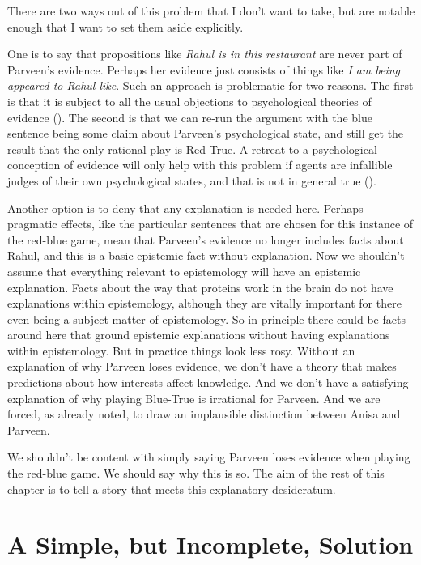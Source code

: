 \documentclass[
  12pt,
  letterpaper,
]{scrbook}
\begin{document}
There are two ways out of this problem that I don't want to take, but
are notable enough that I want to set them aside explicitly.

One is to say that propositions like \emph{Rahul is in this restaurant}
are never part of Parveen's evidence. Perhaps her evidence just consists
of things like \emph{I am being appeared to Rahul-like}. Such an
approach is problematic for two reasons. The first is that it is subject
to all the usual objections to psychological theories of evidence
(). The second is that we
can re-run the argument with the blue sentence being some claim about
Parveen's psychological state, and still get the result that the only
rational play is Red-True. A retreat to a psychological conception of
evidence will only help with this problem if agents are infallible
judges of their own psychological states, and that is not in general
true ().

Another option is to deny that any explanation is needed here. Perhaps
pragmatic effects, like the particular sentences that are chosen for
this instance of the red-blue game, mean that Parveen's evidence no
longer includes facts about Rahul, and this is a basic epistemic fact
without explanation. Now we shouldn't assume that everything relevant to
epistemology will have an epistemic explanation. Facts about the way
that proteins work in the brain do not have explanations within
epistemology, although they are vitally important for there even being a
subject matter of epistemology. So in principle there could be facts
around here that ground epistemic explanations without having
explanations within epistemology. But in practice things look less rosy.
Without an explanation of why Parveen loses evidence, we don't have a
theory that makes predictions about how interests affect knowledge. And
we don't have a satisfying explanation of why playing Blue-True is
irrational for Parveen. And we are forced, as already noted, to draw an
implausible distinction between Anisa and Parveen.

We shouldn't be content with simply saying Parveen loses evidence when
playing the red-blue game. We should say why this is so. The aim of the
rest of this chapter is to tell a story that meets this explanatory
desideratum.

\section{A Simple, but Incomplete, Solution}\label{sec-simplesolution}
\end{document}

